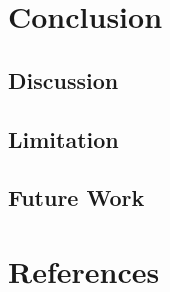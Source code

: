 \documentclass[12pt]{report}
\begin{document}



\chapter{Conclusion}

\section{Discussion}
\section{Limitation}
\section{Future Work}

\newpage
\chapter{References}
\renewcommand\bibname{References}


\end{document}
